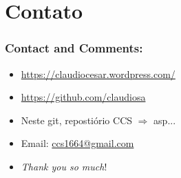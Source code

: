 \documentclass{beamer}
\begin{document}
\section*{Contato}

\begin{frame}
\frametitle{Contact and Comments:}
  
\begin{block}{}
  \begin{itemize}
  \item \url{https://claudiocesar.wordpress.com/}
   \item \url{https://github.com/claudiosa}
   \item Neste git, repostiório CCS $\Rightarrow$ asp...
    \item Email: \url{ccs1664@gmail.com}

  \item \textit{Thank you so much}!

  \end{itemize}
  \end{block}

\end{frame}


\end{document}
